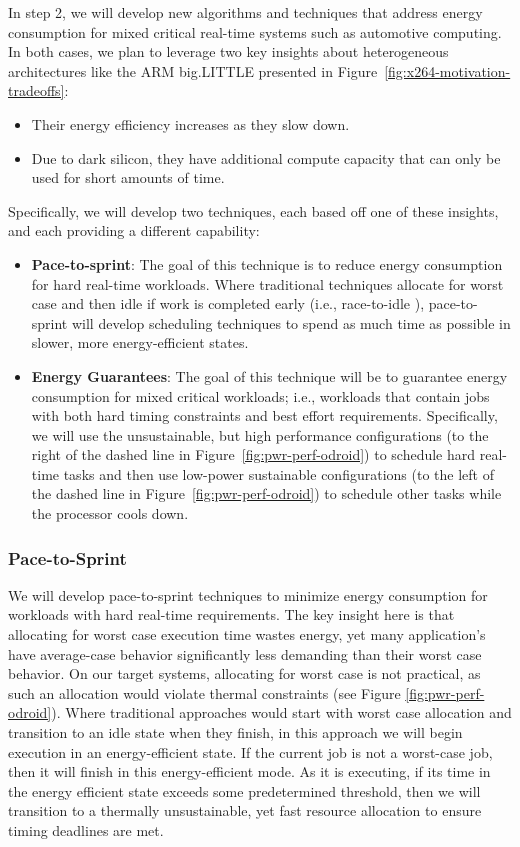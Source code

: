 In step 2, we will develop new algorithms and techniques that address
energy consumption for mixed critical real-time systems such as
automotive computing.  In both cases, we plan to leverage two key
insights about heterogeneous architectures like the ARM big.LITTLE
presented in Figure~\ref{fig:x264-motivation-tradeoffs}:
\begin{itemize}
\item Their energy efficiency increases as they slow down.
\item Due to dark silicon, they have additional compute capacity that
  can only be used for short amounts of time.
\end{itemize}

Specifically, we will develop two techniques, each based off one of
these insights, and each providing a different capability:
\begin{itemize}
\item \textbf{Pace-to-sprint}: The goal of this technique is to reduce
  energy consumption for hard real-time workloads.  Where traditional
  techniques allocate for worst case and then idle if work is
  completed early (i.e., race-to-idle
  \cite{Carroll13,LeSueur11,Imes2014,HotPower}), pace-to-sprint will
  develop scheduling techniques to spend as much time as possible in
  slower, more energy-efficient states.
\item \textbf{Energy Guarantees}: The goal of this technique will be
  to guarantee energy consumption for mixed critical workloads; i.e.,
  workloads that contain jobs with both hard timing constraints and
  best effort requirements.  Specifically, we will use the
  unsustainable, but high performance configurations (to the right of
  the dashed line in Figure~\ref{fig:pwr-perf-odroid}) to schedule hard
  real-time tasks and then use low-power sustainable configurations
  (to the left of the dashed line in Figure~\ref{fig:pwr-perf-odroid}) to
  schedule other tasks while the processor cools down. 
\end{itemize}


\subsubsection{Pace-to-Sprint}
We will develop pace-to-sprint techniques to minimize energy
consumption for workloads with hard real-time requirements.  The key
insight here is that allocating for worst case execution time wastes
energy, yet many application's have average-case behavior
significantly less demanding than their worst case behavior.  On our
target systems, allocating for worst case is not practical, as such an
allocation would violate thermal constraints (see Figure
\ref{fig:pwr-perf-odroid}).  Where traditional approaches would start with
worst case allocation and transition to an idle state when they
finish, in this approach we will begin execution in an
energy-efficient state.  If the current job is not a worst-case job,
then it will finish in this energy-efficient mode.  As it is
executing, if its time in the energy efficient state exceeds some
predetermined threshold, then we will transition to a thermally
unsustainable, yet fast resource allocation to ensure timing deadlines
are met.

